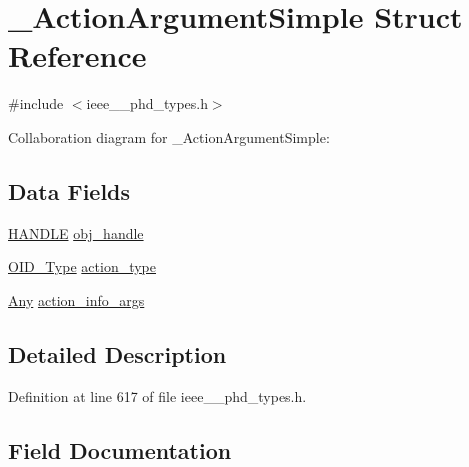 \hypertarget{struct___action_argument_simple}{}\section{\+\_\+\+Action\+Argument\+Simple Struct Reference}
\label{struct___action_argument_simple}


{\ttfamily \#include $<$ieee\+\_\+\_\+phd\+\_\+types.\+h$>$}



Collaboration diagram for \+\_\+\+Action\+Argument\+Simple\+:
\subsection*{Data Fields}
\begin{DoxyCompactItemize}
\item 
\hyperlink{ieee__11073__phd__types_8h_a76f0d44d294babf2e568f7ee676ffca6}{H\+A\+N\+D\+L\+E} \hyperlink{struct___action_argument_simple_abbfff52b7a4956021522f5750c4b32c6}{obj\+\_\+handle}
\item 
\hyperlink{ieee__11073__phd__types_8h_aa4d7af235d4a95d6632aa0d64160dd62}{O\+I\+D\+\_\+\+Type} \hyperlink{struct___action_argument_simple_aa7cb846e240dc56bd1c2fcc0ee736fd5}{action\+\_\+type}
\item 
\hyperlink{ieee__11073__phd__types_8h_a4decf91c0c44a2ed84549e41307f5fdb}{Any} \hyperlink{struct___action_argument_simple_aa60d83842c341dc10b70484bfb38634c}{action\+\_\+info\+\_\+args}
\end{DoxyCompactItemize}


\subsection{Detailed Description}


Definition at line 617 of file ieee\+\_\+\_\+phd\+\_\+types.\+h.



\subsection{Field Documentation}
\hypertarget{struct___action_argument_simple_aa60d83842c341dc10b70484bfb38634c}{}
